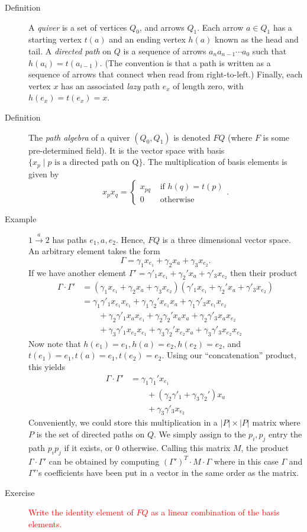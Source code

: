 \documentclass[12pt]{article}
\newcounter{excounter}[subsection]
\newcommand{\exercise}[1]{
\addtocounter{excounter}{1}
\textcolor{red}{\fbox{\Large \Roman{section}.\roman{subsection}.\arabic{excounter}} #1}
}
\begin{document}
\begin{description}
\item[Definition] A \emph{quiver} is a set of vertices $Q_0$, and arrows
  $Q_1$. Each arrow $a\in Q_1$ has a starting vertex $t(a)$ and an
  ending vertex $h(a)$ known as the head and tail. A \emph{directed
    path} on $Q$ is a sequence of arrows $a_na_{n-1}\cdots a_0$ such
  that $h(a_i)=t(a_{i-1})$. (The convention is that a path is written
  as a sequence of arrows that connect when read from right-to-left.)
  Finally, each vertex $x$ has an associated \emph{lazy} path $e_x$
  of length zero, with $h(e_x)=t(e_x)=x$. 
\item[Definition] The \emph{path algebra} of a quiver $(Q_0, Q_1)$ is
  denoted $FQ$ (where $F$ is some pre-determined field). It is the
  vector space with basis $\{x_p \mid p \textrm{~is a directed path on
    Q}\}$. The multiplication of basis elements is given by 
  \[x_px_q = \begin{cases} x_{pq} & \textrm{~if~}h(q)=t(p)\\ 0 & \textrm{~otherwise}\end{cases}.\]
\item[Example] $1 \xrightarrow{a} 2$ has paths $e_1,a,e_2$. Hence,
  $FQ$ is a three dimensional vector space. An arbitrary element takes
  the form 
  \[\Gamma=\gamma_1x_{e_1}+\gamma_2x_a+\gamma_3x_{e_2}.\]
If we have another element
$\Gamma'=\gamma'_1x_{e_1}+\gamma_2'x_a+\gamma'_3x_{e_2}$ then their
product 
\begin{align*}
  \Gamma\cdot \Gamma' &=
                        (\gamma_1x_{e_1}+\gamma_2x_a+\gamma_3x_{e_2})(\gamma'_1x_{e_1}+\gamma_2'x_a+\gamma'_3x_{e_2})\\
&= \gamma_1\gamma'_1x_{e_1}x_{e_1} + \gamma_1\gamma_2'x_{e_1}x_a +
  \gamma_1\gamma'_3x_{e_1}x_{e_2}\\
&\qquad +\gamma_2\gamma'_1x_{a}x_{e_1} + \gamma_2\gamma_2'x_{a}x_a +
  \gamma_2\gamma'_3x_{a}x_{e_2}\\
& \qquad +\gamma_3\gamma'_1x_{e_2}x_{e_1} + \gamma_3\gamma_2'x_{e_2}x_a +
  \gamma_3\gamma'_3x_{e_2}x_{e_2}
\end{align*}
Now note that $h(e_1)=e_1, h(a)=e_2, h(e_2)=e_2$, and
$t(e_1)=e_1,t(a)=e_1, t(e_2)=e_2$. Using our ``concatenation''
product, this yields
\begin{align*}
  \Gamma\cdot \Gamma' &= \gamma_1\gamma_1' x_{e_1}\\
& \qquad +(\gamma_2\gamma'_1+\gamma_3\gamma_2')x_a\\
&\qquad +\gamma_3\gamma'_3 x_{e_2}
\end{align*}
Conveniently, we could store this multiplication in a $\lvert P
\rvert \times \lvert P \rvert$ matrix where $P$ is the set of directed
paths on $Q$. We simply assign to the $p_i,p_j$ entry the path
$p_ip_j$ if it exists, or 0 otherwise. Calling this matrix $M$, the
product $\Gamma\cdot \Gamma'$ can be obtained by computing
$(\Gamma')^T\cdot M\cdot \Gamma$ where in this case $\Gamma$ and
$\Gamma'$'s coefficients have been put in a vector in the same order
as the matrix. 
\item[Exercise] \exercise{Write the identity element of $FQ$ as a
    linear combination of the basis elements.}
\end{description}
\end{document}
